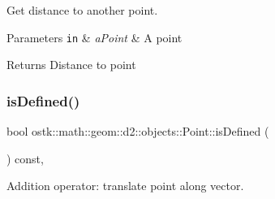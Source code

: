 Get distance to another point. 


\begin{DoxyParams}[1]{Parameters}
\mbox{\tt in}  & {\em a\+Point} & A point \\
\hline
\end{DoxyParams}
\begin{DoxyReturn}{Returns}
Distance to point 
\end{DoxyReturn}
\mbox{\label{classostk_1_1math_1_1geom_1_1d2_1_1objects_1_1_point_a245dd2f0268e1f162804489ac911cb0c}} 
\subsubsection{\texorpdfstring{is\+Defined()}{isDefined()}}
{\footnotesize\ttfamily bool ostk\+::math\+::geom\+::d2\+::objects\+::\+Point\+::is\+Defined (\begin{DoxyParamCaption}{ }\end{DoxyParamCaption}) const\hspace{0.3cm}{\ttfamily [override]}, {\ttfamily [virtual]}}



Addition operator\+: translate point along vector. 


